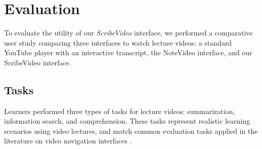 \section{Evaluation}
To evaluate the utility of our \textit{ScribeVideo} interface, we performed a comparative user study comparing three interfaces to watch lecture videos: a standard YouTube player with an interactive transcript, the NoteVideo interface, and our ScribeVideo interface.  

\subsection{Tasks}
Learners performed three types of tasks for lecture videos: summarization, information search, and comprehension. These tasks represent realistic learning scenarios using video lectures, and match common evaluation tasks applied in the literature on video navigation interfaces \cite{}.
